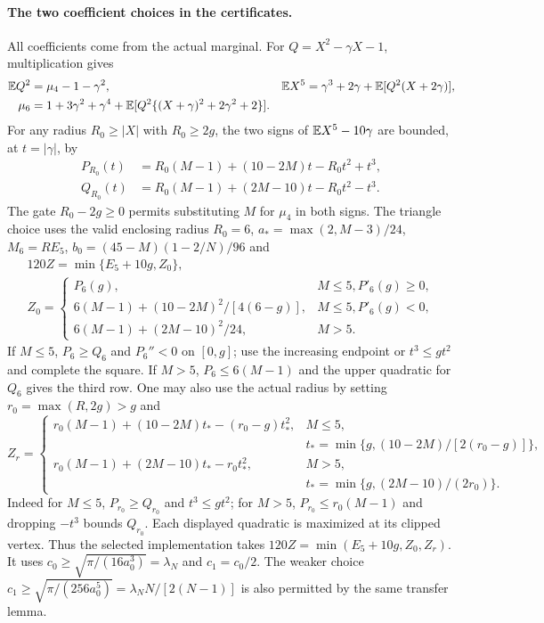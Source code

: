 \paragraph{The two coefficient choices in the certificates.}
All coefficients come from the actual marginal. For $Q=X^2-\gamma X-1$,
multiplication gives
\begin{align}\label{fourier:pearson}
 \mathbb E Q^2&=\mu_4-1-\gamma^2,&
 \mathbb E X^5&=\gamma^3+2\gamma+\mathbb E[Q^2(X+2\gamma)],\notag\\
 \mu_6&=1+3\gamma^2+\gamma^4+
       \mathbb E[Q^2\{(X+\gamma)^2+2\gamma^2+2\}].
\end{align}
For any radius $R_0\ge|X|$ with $R_0\ge2g$, the two signs of
$\mathbb E X^5-10\gamma$ are bounded, at $t=|\gamma|$, by
\begin{align*}
 P_{R_0}(t)&=R_0(M-1)+(10-2M)t-R_0t^2+t^3,\\
 Q_{R_0}(t)&=R_0(M-1)+(2M-10)t-R_0t^2-t^3.
\end{align*}
The gate $R_0-2g\ge0$ permits substituting $M$ for $\mu_4$ in both
signs. The triangle choice uses the valid enclosing radius $R_0=6$, $a_* =\max(2,M-3)/24$,
$M_6=RE_5$, $b_0=(45-M)(1-2/N)/96$ and
\begin{equation}\label{fourier:z0}
\begin{gathered}
 120Z=\min\{E_5+10g,Z_0\},\\
 Z_0=\begin{cases}
 P_6(g),&M\le5, P'_6(g)\ge0,\\
 6(M-1)+(10-2M)^2/[4(6-g)],&M\le5, P'_6(g)<0,\\
 6(M-1)+(2M-10)^2/24,&M>5.
 \end{cases}
\end{gathered}
\end{equation}
If $M\le5$, $P_6\ge Q_6$ and $P_6''<0$ on $[0,g]$; use the
increasing endpoint or $t^3\le gt^2$ and complete the square.
If $M>5$, $P_6\le6(M-1)$ and the upper quadratic for $Q_6$ gives
the third row. One may also use the actual radius by setting
$r_0=\max(R,2g)>g$ and
\[
 Z_r=\begin{cases}
 r_0(M-1)+(10-2M)t_*-(r_0-g)t_*^2,
 & M\le5,\\
 & t_*=\min\{g,(10-2M)/[2(r_0-g)]\},\\
 r_0(M-1)+(2M-10)t_*-r_0t_*^2,
 & M>5,\\
 & t_*=\min\{g,(2M-10)/(2r_0)\}.
 \end{cases}
\]
Indeed for $M\le5$, $P_{r_0}\ge Q_{r_0}$ and $t^3\le gt^2$;
for $M>5$, $P_{r_0}\le r_0(M-1)$ and dropping $-t^3$ bounds
$Q_{r_0}$. Each displayed quadratic is maximized at its clipped vertex.
Thus the selected implementation takes
$120Z=\min(E_5+10g,Z_0,Z_r)$.
It uses $c_0\ge\sqrt{\pi/(16a_0^3)}=\lambda_N$ and $c_1=c_0/2$.
The weaker choice $c_1\ge\sqrt{\pi/(256a_0^5)}
=\lambda_N N/[2(N-1)]$ is also permitted by the same transfer lemma.

